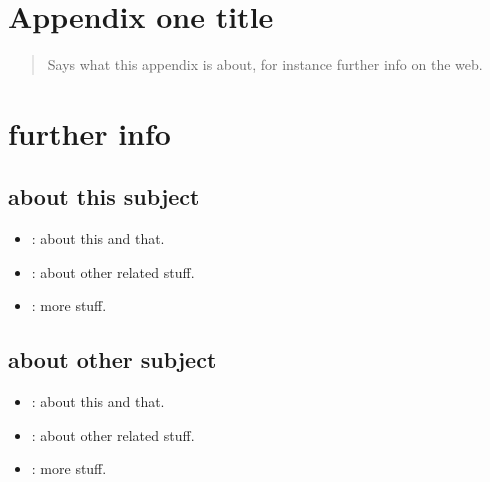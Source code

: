 \section{Appendix one title}\label{app1}

\begin{quote}
Says what this appendix is about, for instance further info on the web.
\end{quote}

\section{further info}

\subsection{about this subject}

\begin{itemize}
\item
  \href{http://useful.org}{}: about this and that.
\item
  \href{http://related.org}{}: about other related stuff.
\item
  \href{http://other.org}{}: more stuff.
\end{itemize}

\subsection{about other subject}

\begin{itemize}
\item
  \href{http://useful2.org}{}: about this and that.
\item
  \href{http://related2.org}{}: about other related stuff.
\item
  \href{http://other2.org}{}: more stuff.
\end{itemize}
